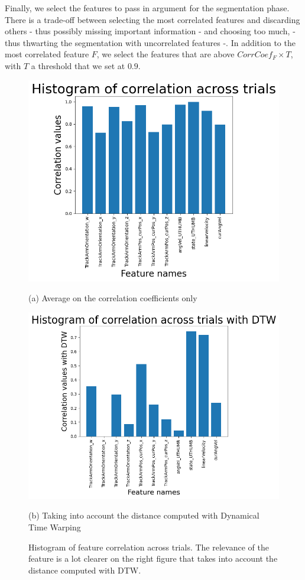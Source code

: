\documentclass[conference]{IEEEtran}
\begin{document}
Finally, we select the features to pass in argument for the segmentation phase. There is a trade-off between selecting the most correlated features and discarding others - thus possibly missing important information - and choosing too much, - thus thwarting the segmentation with uncorrelated features -. In  addition to the most correlated feature $F$, we select the features that are above $CorrCoef_{F} \times T$, with $T$ a threshold that we set at $0.9$. \newline

\begin{figure}[t]
  \centering

  \begin{minipage}[b]{0.47\linewidth}
    \centering
    \includegraphics[width=0.9\linewidth]{img/hist_raw.png}
    \caption*{(a) Average on the correlation coefficients only}
  \end{minipage}
  \hfill
  \begin{minipage}[b]{0.47\linewidth}
    \centering
    \includegraphics[width=0.9\linewidth]{img/hist_dtw.png}
    \caption*{(b) Taking into account the  distance computed with Dynamical Time Warping}
  \end{minipage}

\caption{Histogram of feature correlation across trials. The relevance of the feature is a lot clearer on the right figure that takes into account the distance computed with DTW.}
  \label{fig:histcorr}
\end{figure}
\end{document}
